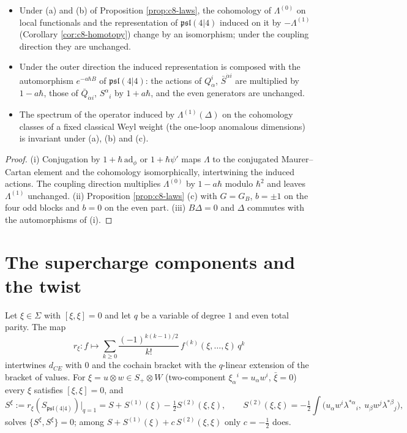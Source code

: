 \begin{theorem}
\label{thm:c8-invariants}
\begin{itemize}
\item[(i)] Under (a) and (b) of Proposition \ref{prop:c8-laws}, the cohomology of $\Lambda^{(0)}$ on local functionals and the representation of $\mathfrak{psl}(4|4)$ induced on it by $-\Lambda^{(1)}$ (Corollary \ref{cor:c8-homotopy}) change by an isomorphism; under the coupling direction they are unchanged.
\item[(ii)] Under the outer direction the induced representation is composed with the automorphism $e^{-a\hbar B}$ of $\mathfrak{psl}(4|4)$: the actions of $Q^i_\alpha$, $\bar S^{\dot\alpha i}$ are multiplied by $1-a\hbar$, those of $\bar Q_{\dot\alpha i}$, $S^\alpha{}_i$ by $1+a\hbar$, and the even generators are unchanged.
\item[(iii)] The spectrum of the operator induced by $\Lambda^{(1)}(\Delta)$ on the cohomology classes of a fixed classical Weyl weight (the one-loop anomalous dimensions) is invariant under (a), (b) and (c).
\end{itemize}
\end{theorem}

\begin{proof}
(i) Conjugation by $1+\hbar\,\mathrm{ad}_\phi$ or $1+\hbar\psi'$ maps $\Lambda$ to the conjugated Maurer--Cartan element and the cohomology isomorphically, intertwining the induced actions. The coupling direction multiplies $\Lambda^{(0)}$ by $1-a\hbar$ modulo $\hbar^2$ and leaves $\Lambda^{(1)}$ unchanged. (ii) Proposition \ref{prop:c8-laws} (c) with $G=G_B$, $b=\pm1$ on the four odd blocks and $b=0$ on the even part. (iii) $B\Delta=0$ and $\Delta$ commutes with the automorphisms of (i).
\end{proof}

\section{The supercharge components and the twist}

\begin{lemma}
\label{lem:c8-ev}
Let $\xi\in\Sigma$ with $[\xi,\xi]=0$ and let $q$ be a variable of degree $1$ and even total parity. The map
\[
r_\xi\colon f\mapsto\sum_{k\ge0}\frac{(-1)^{k(k-1)/2}}{k!}\,f^{(k)}(\xi,\dots,\xi)\,q^k
\]
intertwines $d_{CE}$ with $0$ and the cochain bracket with the $q$-linear extension of the bracket of values. For $\xi=u\otimes w\in S_+\otimes W$ (two-component $\xi_\alpha{}^i=u_\alpha w^i$, $\bar\xi=0$) every $\xi$ satisfies $[\xi,\xi]=0$, and
\begin{equation}
S^\xi:=r_\xi(S_{\mathfrak{psl}(4|4)})\big|_{q=1}=S+S^{(1)}(\xi)-\tfrac12S^{(2)}(\xi,\xi),\qquad S^{(2)}(\xi,\xi)=-\tfrac12\int\big(u_\alpha w^i\lambda^{*\alpha}{}_i,\ u_\beta w^j\lambda^{*\beta}{}_j\big),
\label{eq:c8-twistaction}
\end{equation}
solves $\{S^\xi,S^\xi\}=0$; among $S+S^{(1)}(\xi)+c\,S^{(2)}(\xi,\xi)$ only $c=-\tfrac12$ does.
\end{lemma}

